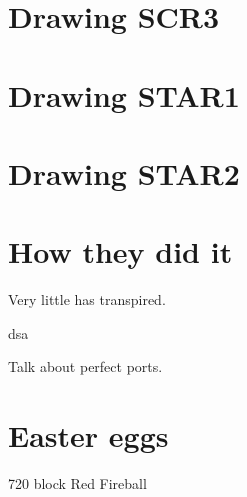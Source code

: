 \section{Drawing SCR3}
\section{Drawing STAR1}
\section{Drawing STAR2}

\section{How they did it}
Very little has transpired.
\pagebreak

dsa

\pagebreak

Talk about perfect ports.


\section{Easter eggs}
720 block
Red Fireball